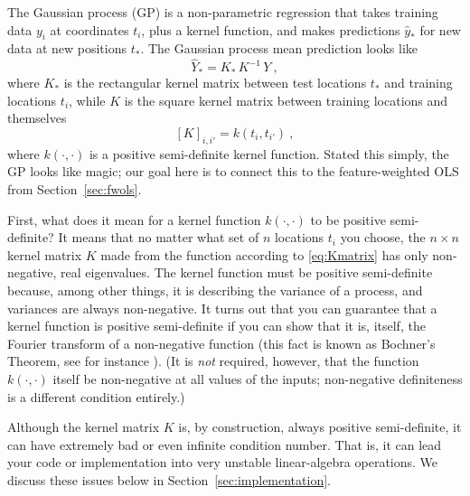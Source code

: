 \documentclass[12pt,letterpaper]{article}
\newcommand{\sectionname}{Section}
\begin{document}
The Gaussian process (GP) is a non-parametric regression that takes training data $y_i$ at coordinates $t_i$, plus a kernel function, and makes predictions $\hat{y}_\ast$ for new data at new positions $t_\ast$.
The Gaussian process mean prediction looks like%
\begin{equation}\label{eq:gpmean}
    \hat{Y}_\ast = K_\ast\,K^{-1}\,Y
    ~,
\end{equation}
where $K_\ast$ is the rectangular kernel matrix between test locations $t_\ast$ and training locations $t_i$, while $K$ is the square kernel matrix between training locations and themselves
\begin{equation}\label{eq:Kmatrix}
    [K]_{i,i'} = k(t_i,t_{i'})
    ~,
\end{equation}
where $k(\cdot,\cdot)$ is a positive semi-definite kernel function.
Stated this simply, the GP looks like magic; our goal here is to connect this to the feature-weighted OLS from \sectionname~\ref{sec:fwols}.

First, what does it mean for a kernel function $k(\cdot,\cdot)$ to be positive semi-definite?
It means that no matter what set of $n$ locations $t_i$ you choose, the $n\times n$ kernel matrix $K$ made from the function according to \eqref{eq:Kmatrix} has only non-negative, real eigenvalues.
The kernel function must be positive semi-definite because, among other things, it is describing the variance of a process, and variances are always non-negative.
It turns out that you can guarantee that a kernel function is positive semi-definite if you can show that it is, itself, the Fourier transform of a non-negative function (this fact is known as Bochner's Theorem, see for instance \citealt{folland2016course}).
(It is \emph{not} required, however, that the function $k(\cdot,\cdot)$ itself be non-negative at all values of the inputs; non-negative definiteness is a different condition entirely.)

Although the kernel matrix $K$ is, by construction, always positive semi-definite, it can have extremely bad or even infinite condition number. That is, it can lead your code or implementation into very unstable linear-algebra operations. We discuss these issues below in \sectionname~\ref{sec:implementation}.
\end{document}
